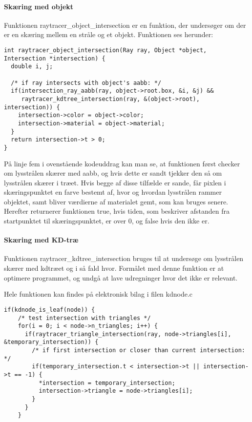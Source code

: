 \paragraph{Skæring med objekt}

Funktionen raytracer\_object\_intersection er en funktion, der undersøger om der er en skæring mellem en stråle og et objekt. Funktionen ses herunder:

\begin{lstlisting}[style=Cstyle, caption=raytracer\_object\_intersection]
int raytracer_object_intersection(Ray ray, Object *object, Intersection *intersection) {
  double i, j;
  
  /* if ray intersects with object's aabb: */
  if(intersection_ray_aabb(ray, object->root.box, &i, &j) && 
     raytracer_kdtree_intersection(ray, &(object->root), intersection)) {
    intersection->color = object->color;
    intersection->material = object->material;
  }
  return intersection->t > 0;
}
\end{lstlisting}

På linje fem i ovenstående kodeuddrag kan man se, at funktionen først checker om lysstrålen skærer med aabb, og hvis dette er sandt tjekker den så om lysstrålen skærer i træet. Hvis begge af disse tilfælde er sande, får pixlen i skæringspunktet en farve bestemt af, hvor og hvordan lysstrålen rammer objektet, samt bliver værdierne af materialet gemt, som kan bruges senere. Herefter returnerer funktionen true, hvis tiden, som beskriver afstanden fra startpunktet til skæringspunktet, er over 0, og false hvis den ikke er.

\paragraph{Skæring med KD-træ}

Funktionen raytracer\_kdtree\_intersection bruges til at undersøge om lysstrålen skærer med kdtræet og i så fald hvor. Formålet med denne funktion er at optimere programmet, og undgå at lave udregninger hvor det ikke er relevant. 

Hele funktionen kan findes på elektronisk bilag i filen kdnode.c

\begin{lstlisting}[style=Cstyle, caption=if(leaf)]
  if(kdnode_is_leaf(node)) {
    /* test intersection with triangles */
    for(i = 0; i < node->n_triangles; i++) {
      if(raytracer_triangle_intersection(ray, node->triangles[i], &temporary_intersection)) {
        /* if first intersection or closer than current intersection: */
        if(temporary_intersection.t < intersection->t || intersection->t == -1) {
          *intersection = temporary_intersection;
          intersection->triangle = node->triangles[i];
        }
      }
    }
\end{lstlisting}

